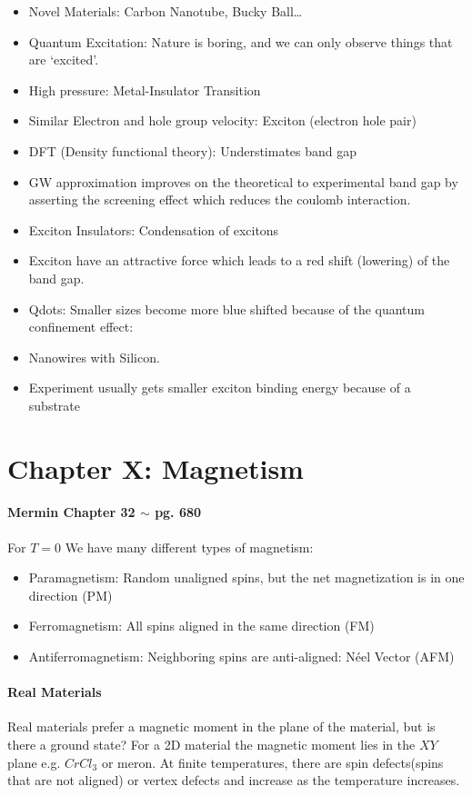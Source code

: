 \documentclass[../main.tex]{subfiles}
\begin{document}
\begin{itemize}
    \item Novel Materials: Carbon Nanotube, Bucky Ball\dots
    \item Quantum Excitation: Nature is boring, and we can only observe things that are `excited'.
    \item High pressure: Metal-Insulator Transition
    \item Similar Electron and hole group velocity: Exciton (electron hole pair) 
    \item DFT (Density functional theory): Understimates band gap
    \item GW approximation improves on the theoretical to experimental band gap by asserting the 
    screening effect which reduces the coulomb interaction. 
    \item Exciton Insulators: Condensation of excitons
    \item Exciton have an attractive force which leads to a red shift (lowering) of the band gap.
    \item Qdots: Smaller sizes become more blue shifted because of the quantum confinement effect:
    \item Nanowires with Silicon.
    \item Experiment usually gets smaller exciton binding energy because of a substrate
\end{itemize}

\newpage
\section*{Chapter X: Magnetism}
\paragraph*{Mermin Chapter 32 $\sim$ pg. 680}
For $T = 0$ We have many different types of magnetism:
\begin{itemize}
    \item Paramagnetism: Random unaligned spins, but the net magnetization is in one direction (PM)
    \item Ferromagnetism: All spins aligned in the same direction (FM)
    \item Antiferromagnetism: Neighboring spins are anti-aligned: N\'eel Vector (AFM)
\end{itemize}
\paragraph*{Real Materials}
Real materials prefer a magnetic moment in the plane of the material, but is there a ground state?
For a 2D material the magnetic moment lies in the $XY$ plane e.g. $CrCl_3$ or meron.
At finite temperatures, there are spin defects(spins that are not aligned) or vertex defects and
increase as the temperature increases. 
\end{document}
